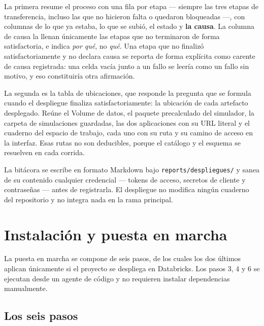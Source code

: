 \documentclass[11pt,a4paper]{article}
\begin{document}
La primera resume el proceso con una fila por etapa --- siempre las tres etapas de transferencia,
incluso las que no hicieron falta o quedaron bloqueadas ---, con columnas de lo que ya estaba, lo
que se subió, el estado y \textbf{la causa}. La columna de causa la llenan únicamente las etapas
que no terminaron de forma satisfactoria, e indica \emph{por qué}, no \emph{qué}. Una etapa que
no finalizó satisfactoriamente y no declara causa se reporta de forma explícita como carente de
causa registrada:
una celda vacía junto a un fallo se leería como un fallo sin motivo, y eso constituiría otra
afirmación.

La segunda es la tabla de ubicaciones, que responde la pregunta que se formula cuando el
despliegue finaliza satisfactoriamente: la ubicación de cada artefacto desplegado. Reúne el
Volume de datos, el paquete precalculado
del simulador, la carpeta de simulaciones guardadas, las dos aplicaciones con su URL literal y
el cuaderno del espacio de trabajo, cada uno con su ruta y su camino de acceso en la interfaz.
Esas rutas no son deducibles, porque el catálogo y el esquema se resuelven en cada corrida.

La bitácora se escribe en formato Markdown bajo \texttt{reports/despliegues/} y sanea de su
contenido cualquier credencial --- tokens de acceso, secretos de cliente y contraseñas --- antes
de registrarla. El despliegue no modifica ningún cuaderno del repositorio y no integra nada en
la rama principal.

\section{Instalación y puesta en marcha}
\label{sec:instalacion}

La puesta en marcha se compone de seis pasos, de los cuales los dos últimos aplican únicamente
si el proyecto se despliega en Databricks. Los pasos 3, 4 y 6 se ejecutan desde un agente de
código y no requieren instalar dependencias manualmente.

\subsection{Los seis pasos}
\end{document}
